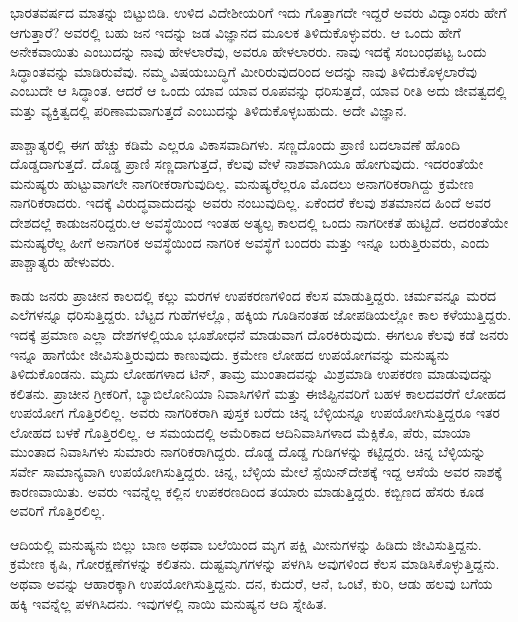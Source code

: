 \vskip 5pt

ಭಾರತವರ್ಷದ ಮಾತನ್ನು ಬಿಟ್ಟುಬಿಡಿ. ಉಳಿದ ವಿದೇಶೀಯರಿಗೆ ಇದು ಗೊತ್ತಾಗದೇ ಇದ್ದರೆ ಅವರು ವಿದ್ವಾಂಸರು ಹೇಗೆ ಆಗುತ್ತಾರೆ? ಅವರಲ್ಲಿ ಬಹು ಜನ ಇದನ್ನು ಜಡ ವಿಜ್ಞಾನದ ಮೂಲಕ ತಿಳಿದುಕೊಳ್ಳುವರು. ಆ ಒಂದು ಹೇಗೆ ಅನೇಕವಾಯಿತು ಎಂಬುದನ್ನು ನಾವು ಹೇಳಲಾರೆವು, ಅವರೂ ಹೇಳಲಾರರು. ನಾವು ಇದಕ್ಕೆ ಸಂಬಂಧಪಟ್ಟ ಒಂದು ಸಿದ್ಧಾಂತವನ್ನು ಮಾಡಿರುವೆವು. ನಮ್ಮ ವಿಷಯಬುದ್ಧಿಗೆ ಮೀರಿರುವುದರಿಂದ ಅದನ್ನು ನಾವು ತಿಳಿದುಕೊಳ್ಳಲಾರೆವು ಎಂಬುದೇ ಆ ಸಿದ್ಧಾಂತ. ಆದರೆ ಆ ಒಂದು ಯಾವ ಯಾವ ರೂಪವನ್ನು ಧರಿಸುತ್ತದೆ, ಯಾವ ರೀತಿ ಅದು ಜೀವತ್ವದಲ್ಲಿ ಮತ್ತು ವ್ಯಕ್ತಿತ್ವದಲ್ಲಿ ಪರಿಣಾಮವಾಗುತ್ತದೆ ಎಂಬುದನ್ನು ತಿಳಿದುಕೊಳ್ಳಬಹುದು. ಅದೇ ವಿಜ್ಞಾನ.

\newpage

ಪಾಶ್ಚಾತ್ಯರಲ್ಲಿ ಈಗ ಹೆಚ್ಚು ಕಡಿಮೆ ಎಲ್ಲರೂ ವಿಕಾಸವಾದಿಗಳು. ಸಣ್ಣದೊಂದು ಪ್ರಾಣಿ ಬದಲಾವಣೆ ಹೊಂದಿ ದೊಡ್ಡದಾಗುತ್ತದೆ. ದೊಡ್ಡ ಪ್ರಾಣಿ ಸಣ್ಣದಾಗುತ್ತದೆ, ಕೆಲವು ವೇಳೆ ನಾಶವಾಗಿಯೂ ಹೋಗುವುದು. ಇದರಂತೆಯೇ ಮನುಷ್ಯರು ಹುಟ್ಟುವಾಗಲೇ ನಾಗರೀಕರಾಗುವುದಿಲ್ಲ. ಮನುಷ್ಯರೆಲ್ಲರೂ ಮೊದಲು ಅನಾಗರಿಕರಾಗಿದ್ದು ಕ್ರಮೇಣ ನಾಗರಿಕರಾದರು. ಇದಕ್ಕೆ ವಿರುದ್ಧವಾದುದನ್ನು ಅವರು ನಂಬುವುದಿಲ್ಲ. ಏಕೆಂದರೆ ಕೆಲವು ಶತಮಾನದ ಹಿಂದೆ ಅವರ ದೇಶದಲ್ಲೆ ಕಾಡುಜನರಿದ್ದರು.ಆ ಅವಸ್ಥೆಯಿಂದ ಇಂತಹ ಅತ್ಯಲ್ಪ ಕಾಲದಲ್ಲಿ ಒಂದು ನಾಗರೀಕತೆ ಹುಟ್ಟಿದೆ. ಅದರಂತೆಯೇ ಮನುಷ್ಯರೆಲ್ಲ ಹೀಗೆ ಅನಾಗರಿಕ ಅವಸ್ಥೆಯಿಂದ ನಾಗರಿಕ ಅವಸ್ಥೆಗೆ ಬಂದರು ಮತ್ತು ಇನ್ನೂ ಬರುತ್ತಿರುವರು, ಎಂದು ಪಾಶ್ಚಾತ್ಯರು ಹೇಳುವರು.

\vskip 5pt

ಕಾಡು ಜನರು ಪ್ರಾಚೀನ ಕಾಲದಲ್ಲಿ ಕಲ್ಲು ಮರಗಳ ಉಪಕರಣಗಳಿಂದ ಕೆಲಸ ಮಾಡುತ್ತಿದ್ದರು. ಚರ್ಮವನ್ನೂ ಮರದ ಎಲೆಗಳನ್ನೂ ಧರಿಸುತ್ತಿದ್ದರು. ಬೆಟ್ಟದ ಗುಹೆಗಳಲ್ಲೊ, ಹಕ್ಕಿಯ ಗೂಡಿನಂತಹ ಜೋಪಡಿಯಲ್ಲೋ ಕಾಲ ಕಳೆಯುತ್ತಿದ್ದರು. ಇದಕ್ಕೆ ಪ್ರಮಾಣ ಎಲ್ಲಾ ದೇಶಗಳಲ್ಲಿಯೂ ಭೂಶೋಧನೆ ಮಾಡುವಾಗ ದೊರಕಿರುವುದು. ಈಗಲೂ ಕೆಲವು ಕಡೆ ಜನರು ಇನ್ನೂ ಹಾಗೆಯೇ ಜೀವಿಸುತ್ತಿರುವುದು ಕಾಣುವುದು. ಕ್ರಮೇಣ ಲೋಹದ ಉಪಯೋಗವನ್ನು ಮನುಷ್ಯನು ತಿಳಿದುಕೊಂಡನು. ಮೃದು ಲೋಹಗಳಾದ ಟಿನ್​, ತಾಮ್ರ ಮುಂತಾದವನ್ನು ಮಿಶ್ರಮಾಡಿ ಉಪಕರಣ ಮಾಡುವುದನ್ನು ಕಲಿತನು. ಪ್ರಾಚೀನ ಗ್ರೀಕರಿಗೆ, ಬ್ಯಾಬಿಲೋನಿಯಾ ನಿವಾಸಿಗಳಿಗೆ ಮತ್ತು ಈಜಿಪ್ಟಿನವರಿಗೆ ಬಹಳ ಕಾಲದವರೆಗೆ ಲೋಹದ ಉಪಯೋಗ ಗೊತ್ತಿರಲಿಲ್ಲ. ಅವರು ನಾಗರಿಕರಾಗಿ ಪುಸ್ತಕ ಬರೆದು ಚಿನ್ನ ಬೆಳ್ಳಿಯನ್ನೂ ಉಪಯೋಗಿಸುತ್ತಿದ್ದರೂ ಇತರ ಲೋಹದ ಬಳಕೆ ಗೊತ್ತಿರಲಿಲ್ಲ. ಆ ಸಮಯದಲ್ಲಿ ಅಮೆರಿಕಾದ ಆದಿನಿವಾಸಿಗಳಾದ ಮೆಕ್ಸಿಕೊ, ಪೆರು, ಮಾಯಾ ಮುಂತಾದ ನಿವಾಸಿಗಳು ಸುಮಾರು ನಾಗರಿಕರಾಗಿದ್ದರು. ದೊಡ್ಡ ದೊಡ್ಡ ಗುಡಿಗಳನ್ನು ಕಟ್ಟಿದ್ದರು. ಚಿನ್ನ ಬೆಳ್ಳಿಯನ್ನು ಸರ್ವೇ ಸಾಮಾನ್ಯವಾಗಿ ಉಪಯೋಗಿಸುತ್ತಿದ್ದರು. ಚಿನ್ನ, ಬೆಳ್ಳಿಯ ಮೇಲೆ ಸ್ಪೆಯಿನ್​ ದೇಶಕ್ಕೆ ಇದ್ದ ಆಸೆಯೆ ಅವರ ನಾಶಕ್ಕೆ ಕಾರಣವಾಯಿತು. ಅವರು ಇವನ್ನೆಲ್ಲ ಕಲ್ಲಿನ ಉಪಕರಣದಿಂದ ತಯಾರು ಮಾಡುತ್ತಿದ್ದರು. ಕಬ್ಬಿಣದ ಹೆಸರು ಕೂಡ ಅವರಿಗೆ ಗೊತ್ತಿರಲಿಲ್ಲ.

\vskip 5pt

ಆದಿಯಲ್ಲಿ ಮನುಷ್ಯನು ಬಿಲ್ಲು ಬಾಣ ಅಥವಾ ಬಲೆಯಿಂದ ಮೃಗ ಪಕ್ಷಿ ಮೀನುಗಳನ್ನು ಹಿಡಿದು ಜೀವಿಸುತ್ತಿದ್ದನು. ಕ್ರಮೇಣ ಕೃಷಿ, ಗೋರಕ್ಷಣೆಗಳನ್ನು ಕಲಿತನು. ದುಷ್ಟಮೃಗಗಳನ್ನು ಪಳಗಿಸಿ ಅವುಗಳಿಂದ ಕೆಲಸ ಮಾಡಿಸಿಕೊಳ್ಳುತ್ತಿದ್ದನು. ಅಥವಾ ಅವನ್ನು ಆಹಾರಕ್ಕಾಗಿ ಉಪಯೋಗಿಸುತ್ತಿದ್ದನು. ದನ, ಕುದುರೆ, ಆನೆ, ಒಂಟೆ, ಕುರಿ, ಆಡು ಹಲವು ಬಗೆಯ ಹಕ್ಕಿ ಇವನ್ನೆಲ್ಲ ಪಳಗಿಸಿದನು. ಇವುಗಳಲ್ಲಿ ನಾಯಿ ಮನುಷ್ಯನ ಆದಿ ಸ್ನೇಹಿತ.


